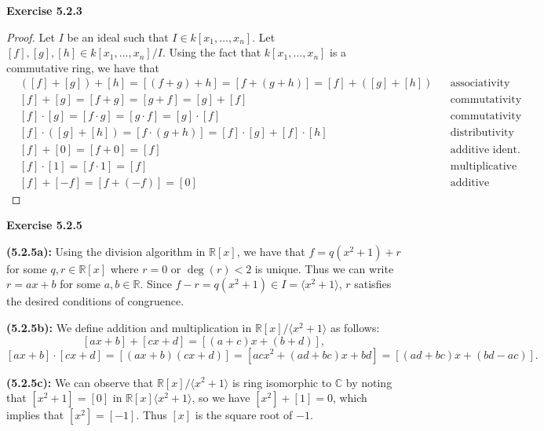 \documentclass[12pt,oneside]{article}
\newenvironment{exercise}[1]{\vspace{.1in}\noindent\textbf{Exercise #1 \hspace{.05em}}}{}
\newcommand{\R}{\mathbb{R}}
\newcommand{\C}{\mathbb{C}}
\begin{document}

\begin{exercise}{5.2.3}
    \begin{proof}
        Let $I$ be an ideal such that $I \in k[x_1,\ldots,x_n]$.
        Let $[f],[g],[h] \in k[x_1,\ldots,x_n]/I$. Using the 
        fact that $k[x_1,\ldots,x_n]$ is a commutative ring, 
        we have that 
        \begin{align*}
            &([f]+[g])+[h] = [(f+g)+h]=[f+(g+h)]=[f]+([g]+[h]) && \text{associativity (+)}\\
            &[f]+[g] = [f+g] = [g+f] = [g]+[f]  && \text{commutativity (+)}\\
            &[f]\cdot[g] = [f\cdot g] = [g \cdot f] = [g] \cdot [f]  && \text{commutativity (*)}\\
            &[f]\cdot([g]+[h]) = [f \cdot (g+h)] = [f] \cdot [g] + [f] \cdot [h]    && \text{distributivity}\\
            &[f] + [0] = [f+0] = [f]    && \text{additive ident.}\\
            &[f] \cdot [1] = [f \cdot 1] = [f]  && \text{multiplicative ident.}\\
            &[f] + [-f] = [f+(-f)]=[0]  && \text{additive inverse}
        \end{align*}
    \end{proof}
\end{exercise}


\begin{exercise}{5.2.5}

    \bigskip
    \textbf{(5.2.5a):}
    Using the division algorithm in $\R[x]$, we have that 
    $f = q(x^2+1)+r$ for some $q,r \in \R[x]$ where $r=0$ or $\deg{(r)} < 2$ 
    is unique. Thus we can write $r = ax+b$ for some $a,b \in \R$.
    Since $f-r = q(x^2+1) \in I= \langle x^2+1 \rangle$, $r$ satisfies
    the desired conditions of congruence.

    \bigskip
    \textbf{(5.2.5b):}
    We define addition and multiplication in $\R[x]/\langle x^2+1 \rangle$ 
    as follows:
    \[
        [ax+b]+[cx+d]       = [(a+c)x+(b+d)],
    \]
    \[
        [ax+b]\cdot[cx+d]   = [(ax+b)(cx+d)] = [acx^2+(ad+bc)x+bd] = [(ad+bc)x+(bd-ac)].
    \]

    \bigskip
    \textbf{(5.2.5c):}
    We can observe that $\R[x]/\langle x^2+1 \rangle$ is ring 
    isomorphic to $\C$ by noting that $[x^2+1]=[0]$ in 
    $\R[x]\langle x^2+1 \rangle$, so we have $[x^2]+[1]=0$, 
    which implies that $[x^2] = [-1]$. Thus $[x]$ is the square 
    root of $-1$.

\end{exercise}
\end{document}
